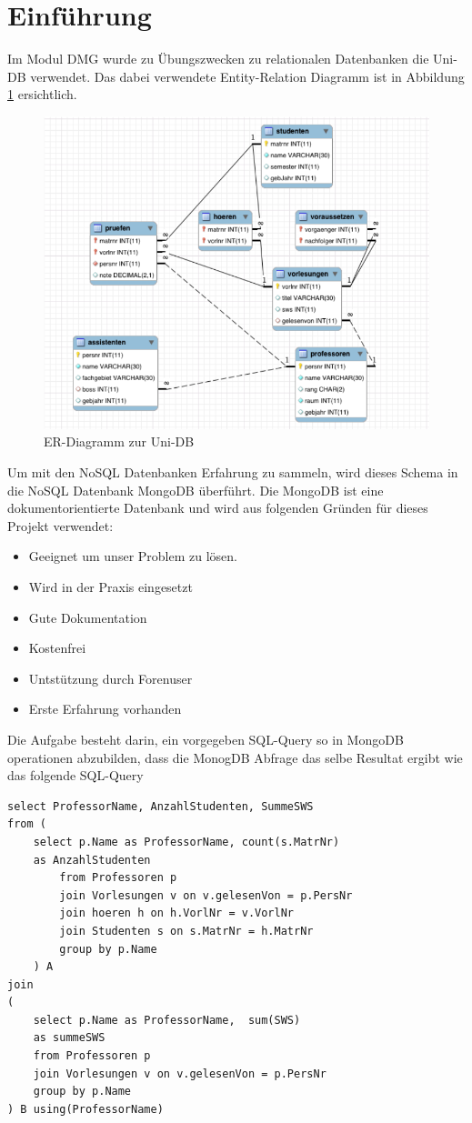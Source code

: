 \section{Einführung}
Im Modul DMG wurde zu Übungszwecken zu relationalen Datenbanken die Uni-DB 
verwendet. Das dabei verwendete Entity-Relation Diagramm ist in Abbildung
\ref{fig:uni-db} ersichtlich.
\begin{figure}[htbp] 
  \centering
     \includegraphics[width=1\textwidth]{./pictures/SQL-DB_ER_Diagramm_UNI-DB.png}
  \caption{ER-Diagramm zur Uni-DB \cite{Kaufmann2016_S1}}
  \label{fig:uni-db}
\end{figure}
 Um mit den NoSQL Datenbanken Erfahrung zu sammeln, wird dieses Schema in die NoSQL Datenbank MongoDB überführt.
Die MongoDB ist eine dokumentorientierte Datenbank und  wird aus folgenden
Gründen für dieses Projekt verwendet:
\begin{itemize}
  \item Geeignet um unser Problem zu lösen.
  \item Wird in der Praxis eingesetzt
  \item Gute Dokumentation
  \item Kostenfrei
  \item Untstützung durch Forenuser
  \item Erste Erfahrung vorhanden
\end{itemize}
Die Aufgabe besteht darin, ein vorgegeben SQL-Query so in MongoDB operationen
abzubilden, dass die MonogDB Abfrage das selbe Resultat ergibt wie das folgende 
SQL-Query
\begin{lstlisting}
select ProfessorName, AnzahlStudenten, SummeSWS 
from ( 
	select p.Name as ProfessorName, count(s.MatrNr) 
	as AnzahlStudenten 
		from Professoren p 
		join Vorlesungen v on v.gelesenVon = p.PersNr
		join hoeren h on h.VorlNr = v.VorlNr 
		join Studenten s on s.MatrNr = h.MatrNr 
		group by p.Name 
	) A 
join 
( 
	select p.Name as ProfessorName,  sum(SWS) 
	as summeSWS 
	from Professoren p 
	join Vorlesungen v on v.gelesenVon = p.PersNr 
	group by p.Name 
) B using(ProfessorName)
\end{lstlisting}